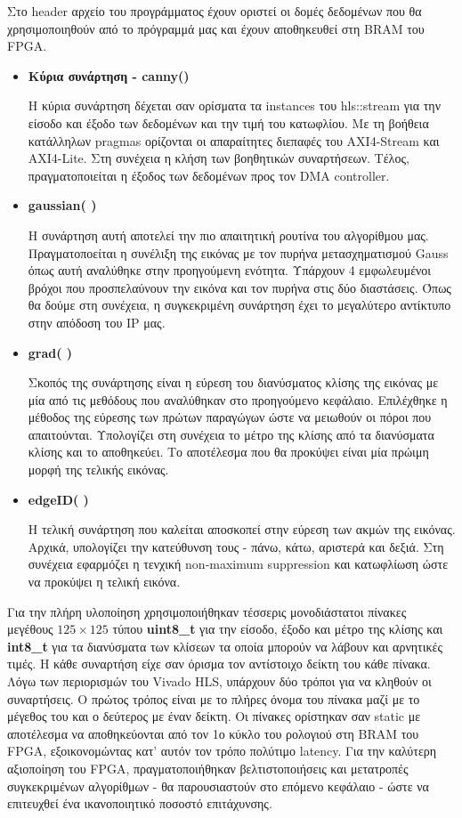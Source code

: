 Στο header αρχείο του προγράμματος έχουν οριστεί οι δομές δεδομένων που θα χρησιμοποιηθούν από το πρόγραμμά μας και έχουν αποθηκευθεί στη BRAM του FPGA.
\begin{itemize}[label={},leftmargin=*]
	\item{ \textbf{Κύρια συνάρτηση - canny()}}

	Η κύρια συνάρτηση δέχεται σαν ορίσματα τα instances του hls::stream για την είσοδο και έξοδο των δεδομένων και την τιμή του κατωφλίου. Με τη βοήθεια κατάλληλων pragmas ορίζονται οι απαραίτητες διεπαφές του AXI4-Stream και AXI4-Lite. Στη συνέχεια η κλήση των βοηθητικών συναρτήσεων. Τέλος, πραγματοποιείται η έξοδος των δεδομένων προς τον DMA controller. \\
	\newpage
	\item{\textbf{gaussian( )}}

	Η συνάρτηση αυτή αποτελεί την πιο απαιτητική ρουτίνα του αλγορίθμου μας. Πραγματοποείται η συνέλιξη της εικόνας με τον πυρήνα μετασχηματισμού Gauss όπως αυτή αναλύθηκε στην προηγούμενη ενότητα. Υπάρχουν 4 εμφωλευμένοι βρόχοι που προσπελαύνουν την εικόνα και τον πυρήνα στις δύο διαστάσεις. Όπως θα δούμε στη συνέχεια, η συγκεκριμένη συνάρτηση έχει το μεγαλύτερο αντίκτυπο στην απόδοση του IP μας. \\

	\item{ \textbf{grad( )}}

	Σκοπός της συνάρτησης είναι η εύρεση του διανύσματος κλίσης της εικόνας με μία από τις μεθόδους που αναλύθηκαν στο προηγούμενο κεφάλαιο. Επιλέχθηκε η μέθοδος της εύρεσης των πρώτων παραγώγων ώστε να μειωθούν οι πόροι που απαιτούνται. Υπολογίζει στη συνέχεια το μέτρο της κλίσης από τα διανύσματα κλίσης και το αποθηκεύει. Το αποτέλεσμα που θα προκύψει είναι μία πρώιμη μορφή της τελικής εικόνας. \\

	\item{ \textbf{edgeID( )}}

	Η τελική συνάρτηση που καλείται αποσκοπεί στην εύρεση των ακμών της εικόνας. Αρχικά, υπολογίζει την κατεύθυνση τους - πάνω, κάτω, αριστερά και δεξιά. Στη συνέχεια εφαρμόζει η τενχική non-maximum suppression και κατωφλίωση ώστε να προκύψει η τελική εικόνα. \\
\end{itemize}

Για την πλήρη υλοποίηση χρησιμοποιήθηκαν τέσσερις μονοδιάστατοι πίνακες μεγέθους $125\times 125$ τύπου \textbf{uint8\_t} για την είσοδο, έξοδο και μέτρο της κλίσης και \textbf{int8\_t} για  τα διανύσματα των κλίσεων τα οποία μπορούν να λάβουν και αρνητικές τιμές. Η κάθε συναρτήση είχε σαν όρισμα τον αντίστοιχο δείκτη του κάθε πίνακα. Λόγω των περιορισμών του Vivado HLS, υπάρχουν δύο τρόποι για να κληθούν οι συναρτήσεις. Ο πρώτος τρόπος είναι με το πλήρες όνομα του πίνακα μαζί με το μέγεθος του και ο δεύτερος με έναν δείκτη. Οι πίνακες ορίστηκαν σαν static με αποτέλεσμα να αποθηκεύονται από τον 1ο κύκλο του ρολογιού στη BRAM του FPGA, εξοικονομώντας κατ' αυτόν τον τρόπο πολύτιμο latency.
\newpage
Για την καλύτερη αξιοποίηση του FPGA, πραγματοποιήθηκαν βελτιστοποιήσεις και μετατροπές συγκεκριμένων αλγορίθμων  - θα παρουσιαστούν στο επόμενο κεφάλαιο - ώστε να επιτευχθεί ένα ικανοποιητικό ποσοστό επιτάχυνσης.
